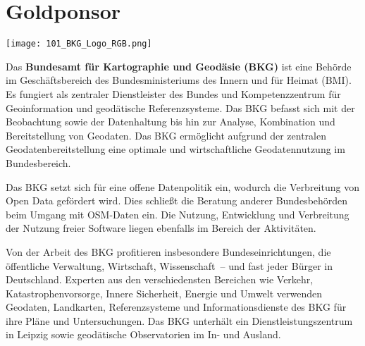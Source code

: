 \section*{Goldponsor}
\begin{flushright}
\texttt{[image: 101\_BKG\_Logo\_RGB.png]}
\end{flushright}
\noindent
Das {\bfseries Bundesamt für Kartographie und Geodäsie (BKG)} ist eine Behörde im Geschäftsbereich des Bundesministeriums des Innern und für Heimat (BMI). Es fungiert als zentraler Dienstleister des Bundes und Kompetenzzentrum für Geoinformation und geodätische Referenzsysteme. Das BKG befasst sich mit der Beobachtung sowie der Datenhaltung bis hin zur Analyse, Kombination und Bereitstellung von Geodaten. Das BKG ermöglicht aufgrund der zentralen Geodatenbereitstellung eine optimale und wirtschaftliche Geodatennutzung im Bundesbereich.

\noindent
Das BKG setzt sich für eine offene Datenpolitik ein, wodurch die Verbreitung von Open Data gefördert wird. Dies schließt die Beratung anderer Bundesbehörden beim Umgang mit OSM-Daten ein. Die Nutzung, Entwicklung und Verbreitung der Nutzung freier Software liegen ebenfalls im Bereich der Aktivitäten.

\noindent
Von der Arbeit des BKG profitieren insbesondere Bundeseinrichtungen, die öffentliche Verwaltung, Wirtschaft, Wissenschaft~-- und fast jeder Bürger in Deutschland. Experten aus den verschiedensten Bereichen wie Verkehr, Katastrophenvorsorge, Innere Sicherheit, Energie und Umwelt verwenden Geodaten, Landkarten, Referenzsysteme und Informationsdienste des BKG für ihre Pläne und Untersuchungen. Das BKG unterhält ein Dienstleistungszentrum in Leipzig sowie geodätische Observatorien im In- und Ausland.
